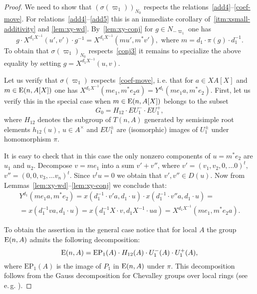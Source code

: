 \begin{proof}
    We need to show that $(\sigma(\varpi_1))_{N_0}$ respects the relations~\eqref{add4}--\eqref{coef-move}.
    For relations~\eqref{add4}--\eqref{add5} this is an immediate corollary of~\cref{itm:xsmall-additivity} and \cref{lem:xy-wd}.
    By~\cref{lem:xy-conj} for $g \in N_{-\varpi_1}$ one has
    \begin{equation}
        \label{eq:xy-conj-n1}
        g \cdot X^{d_1 X^{-1}}(u', v') \cdot g^{-1} = X^{d_1 X^{-1}}(mu', m^*v'), \text{ where } m = d_1 \cdot \pi(g) \cdot d_1^{-1}.
    \end{equation}
    To obtain that $\sigma(\varpi_1)_{N_0}$ respects~\eqref{conj3} it remains to specialize the above equality by setting $g = X^{d_1 X^{-1}}(u, v)$.

    Let us verify that $\sigma(\varpi_1)$ respects~\eqref{coef-move}, i.\,e. that for $a\in XA[X]$ and $m \in \operatorname{E}(n, A[X])$ one has
    $X^{d_1 X^{-1}}(me_1, m^*e_2 a) = Y^{d_1}(me_1 a, m^* e_2)$.
    First, let us verify this in the special case when $m \in \operatorname{E}(n, A[X])$ belongs to the subset
    \[G_0 = H_{12} \cdot EU^-_1 \cdot EU^+_1,\]
    where $H_{12}$ denotes the subgroup of $T(n, A)$ generated by semisimple root elements $h_{12}(u)$, $u \in A^\times$
     and $EU^\pm_1$ are (isomorphic) images of $U^\pm_1$ under homomorphism $\pi$.

    It is easy to check that in this case the only nonzero components of $u = m^* e_2$ are $u_1$ and $u_2$.
    Decompose $v = m e_1$ into a sum $v' + v''$, where $v' = (v_1, v_2, 0, \ldots 0)^t,$ $v'' = (0, 0, v_3, \ldots v_n)^t$.
    Since $v^t u = 0$ we obtain that $v', v'' \in D(u)$.
    Now from Lemmas~\ref{lem:xy-wd}--\ref{lem:xy-conj} we conclude that:
    \begin{multline}
        \label{eq:special-case}
        Y^{d_1}(me_{1}a, m^* e_2) = x(d_1^{-1} \cdot v'a, d_1\cdot  u) \cdot x(d_1^{-1}\cdot v''a, d_1 \cdot u) = \\
        = x(d_1^{-1} va, d_1 \cdot u) = x(d_1^{-1}X \cdot v, d_{1}X^{-1} \cdot u a) = X^{d_1 X^{-1}}(me_1, m^*e_2 a).
    \end{multline}

    To obtain the assertion in the general case notice that for local $A$ the group $\operatorname{E}(n, A)$ admits the following decomposition:
    \[\operatorname{E}(n, A) = \mathrm{EP}_1(A) \cdot H_{12}(A) \cdot U^-_1(A) \cdot U^+_1(A), \]
    where $\mathrm{EP}_1(A)$ is the image of $P_1$ in $\operatorname{E}(n, A)$ under $\pi$.
    This decomposition follows from the Gauss decomposition for Chevalley groups over local rings (see e.\,g. \cite[Theorem~1.1]{Sm12}).


\end{proof}
